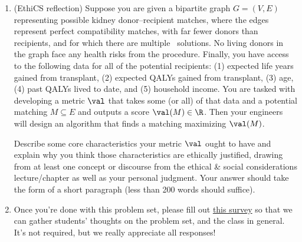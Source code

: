 \documentclass[11pt]{article}
\begin{document}
\begin{enumerate}
\begin{enumerate}

        Show how to assign weights to the patients $p_0,\ldots,p_3$ so that there is no matching that simultaneously maximizes $w(M)$ and $|M|$ over all matchings $M$ that \textbf{satisfy the paired donor-patient constraint}.

 \bigskip
 \item (EthiCS reflection) Suppose you are given a bipartite graph $G=(V,E)$ representing possible kidney donor--recipient matches, where the edges represent perfect compatibility matches, with far fewer donors than recipients, and for which there are multiple \MaximumMatching\ solutions. No living donors in the graph face any health risks from the procedure. Finally, you have access to the following data for all of the potential recipients: (1) expected life years gained from transplant, (2) expected QALYs gained from transplant, (3) age, (4) past QALYs lived to date, and (5) household income. You are tasked with developing a metric $\val$ that takes some (or all) of that data
 and a potential matching $M\subseteq E$ and outputs a score $\val(M)\in \R$.
 Then your engineers will design an algorithm that finds a matching maximizing $\val(M)$.

 Describe some core characteristics your metric $\val$ ought to have and explain why you think those characteristics are ethically justified, drawing from at least one concept or discourse from the ethical \& social considerations lecture/chapter as well as your personal judgment. Your answer should take the form of a short paragraph (less than 200 words should suffice).

\bigskip
\item Once you're done with this problem set, please fill out \href{https://forms.gle/DXmsSamwujm3oSEw5}{this survey} so that we can gather students' thoughts on the problem set, and the class in general. It's not required, but we really appreciate all responses!

\end{enumerate}

\fi
\end{enumerate}
\end{document}
